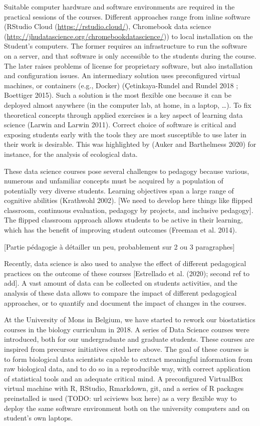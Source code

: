 \documentclass[
]{article}
\begin{document}
Suitable computer hardware and software environments are required in the
practical sessions of the courses. Different approaches range from
inline software (RStudio Cloud (\url{https://rstudio.cloud/}),
Chromebook data science
(\url{http://jhudatascience.org/chromebookdatascience/})) to local
installation on the Student's computers. The former requires an
infrastructure to run the software on a server, and that software is
only accessible to the students during the course. The later raises
problems of license for proprietary software, but also installation and
configuration issues. An intermediary solution uses preconfigured
virtual machines, or containers (e.g., Docker) (Çetinkaya-Rundel and
Rundel 2018 ; Boettiger 2015). Such a solution is the most flexible one
because it can be deployed almost anywhere (in the computer lab, at
home, in a laptop, \ldots). To fix theoretical concepts through applied
exercises is a key aspect of learning data science (Larwin and Larwin
2011). Correct choice of software is critical and exposing students
early with the tools they are most susceptible to use later in their
work is desirable. This was highlighted by (Auker and Barthelmess 2020)
for instance, for the analysis of ecological data.

These data science courses pose several challenges to pedagogy because
various, numerous and unfamiliar concepts must be acquired by a
population of potentially very diverse students. Learning objectives
span a large range of cognitive abilities (Krathwohl 2002). {[}We need
to develop here things like flipped classroom, continuous evaluation,
pedagogy by projects, and inclusive pedagogy{]}. The flipped classroom
approach allows students to be active in their learning, which has the
benefit of improving student outcomes (Freeman et al. 2014).

{[}Partie pédagogie à détailler un peu, probablement sur 2 ou 3
paragraphes{]}

Recently, data science is also used to analyse the effect of different
pedagogical practices on the outcome of these courses {[}Estrellado et
al. (2020); second ref to add{]}. A vast amount of data can be collected
on students activities, and the analysis of these data allows to compare
the impact of different pedagogical approaches, or to quantify and
document the impact of changes in the courses.

At the University of Mons in Belgium, we have started to rework our
biostatistics courses in the biology curriculum in 2018. A series of
Data Science courses were introduced, both for our undergraduate and
graduate students. These courses are inspired from precursor initiatives
cited here above. The goal of these courses is to form biological data
scientists capable to extract meaningful information from raw biological
data, and to do so in a reproducible way, with correct application of
statistical tools and an adequate critical mind. A preconfigured
VirtualBox virtual machine with R, RStudio, Rmarkdown, git, and a series
of R packages preinstalled is used (TODO: url sciviews box here) as a
very flexible way to deploy the same software environment both on the
university computers and on student's own laptops.
\end{document}

